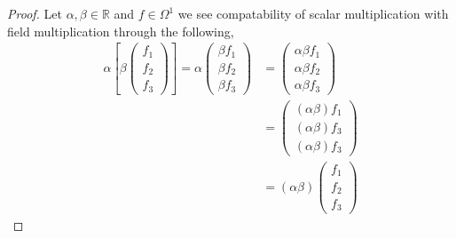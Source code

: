 \documentclass[12pt]{article}
\newcommand      {\Rm}         {{\mathbb R}}
\begin{document}
\begin{itemize}
\begin{itemize}
\begin{proof}
                Let $\alpha,\beta \in \Rm$ and $f\in \Omega^1$ we see compatability of scalar multiplication with field multiplication through the following,
                \begin{align*}
                    \alpha\left[\beta \begin{pmatrix}f_1 \\ f_2 \\ f_3 \end{pmatrix}\right] = \alpha \begin{pmatrix}\beta f_1 \\ \beta f_2 \\ \beta f_3 \end{pmatrix} &= \begin{pmatrix}\alpha\beta f_1 \\ \alpha\beta f_2 \\ \alpha\beta f_3 \end{pmatrix} \\
                    &= \begin{pmatrix}(\alpha \beta) f_1 \\ (\alpha \beta)f_3 \\ (\alpha \beta)f_3  \end{pmatrix} \\
                    &= (\alpha\beta) \begin{pmatrix}f_1 \\ f_2 \\ f_3 \end{pmatrix}
                \end{align*}


\end{proof}
\end{itemize}
\end{itemize}
\end{document}
